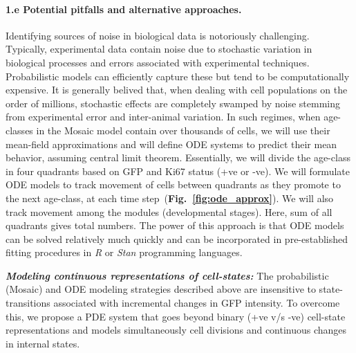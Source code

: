 \documentclass[11pt]{article}
\newcommand{\para}[1]{\vspace*{-4.5mm}\paragraph{#1}}
\begin{document}
\para{1.e Potential pitfalls and alternative approaches.}
Identifying sources of noise in biological data is notoriously challenging.
Typically, experimental data contain noise due to stochastic variation in biological processes and errors associated with experimental techniques.
Probabilistic models can efficiently capture these but tend to be computationally expensive.
It is generally belived that, when dealing with cell populations on the order of millions, stochastic effects are completely swamped by noise stemming from experimental error and inter-animal variation.
In such regimes, when age-classes in the Mosaic model contain over thousands of cells, we will use their mean-field approximations and will define ODE systems to predict their mean behavior, assuming central limit theorem. 
Essentially, we will divide the age-class in four quadrants based on GFP and Ki67 status (+ve or -ve). %
We will formulate ODE models to track movement of cells between quadrants as they promote to the next age-class, at each time step~(\textbf{Fig.~\ref{fig:ode_approx}}).
We will also track movement among the modules (developmental stages).
Here, sum of all quadrants gives total numbers. %
The power of this approach is that ODE models can be solved relatively much quickly and can be incorporated in pre-established fitting procedures in \textit{R} or \textit{Stan} programming languages.

\textbf{\textit{Modeling continuous representations of cell-states:}}
The probabilistic (Mosaic) and ODE modeling strategies described above %
are insensitive to state-transitions associated with incremental changes in GFP intensity. 
To overcome this, we propose a PDE system that goes beyond binary (+ve v/s -ve) cell-state representations and models simultaneously cell divisions and continuous changes in internal states.
\end{document}
